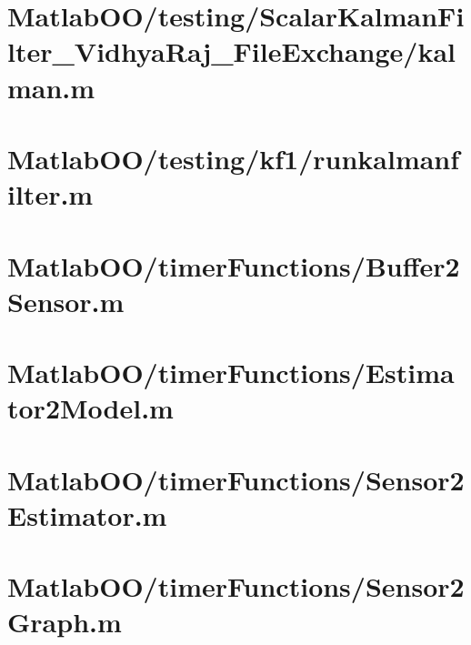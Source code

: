 \pagebreak
\section{MatlabOO/testing/ScalarKalmanFilter\_VidhyaRaj\_FileExchange/kalman.m}\label{code:MatlabOO/testing/ScalarKalmanFilter_VidhyaRaj_FileExchange/kalman.m}


\pagebreak
\section{MatlabOO/testing/kf1/runkalmanfilter.m}\label{code:MatlabOO/testing/kf1/runkalmanfilter.m}


\pagebreak
\section{MatlabOO/timerFunctions/Buffer2Sensor.m}\label{code:MatlabOO/timerFunctions/Buffer2Sensor.m}


\pagebreak
\section{MatlabOO/timerFunctions/Estimator2Model.m}\label{code:MatlabOO/timerFunctions/Estimator2Model.m}


\pagebreak
\section{MatlabOO/timerFunctions/Sensor2Estimator.m}\label{code:MatlabOO/timerFunctions/Sensor2Estimator.m}


\pagebreak
\section{MatlabOO/timerFunctions/Sensor2Graph.m}\label{code:MatlabOO/timerFunctions/Sensor2Graph.m}



